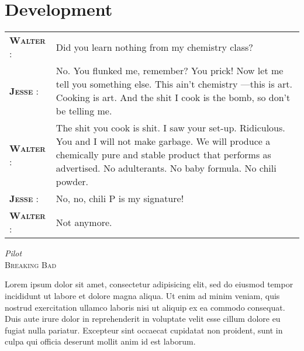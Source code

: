 \chapter{Development} %
\label{cha:development}

\setlength{\epigraphwidth}{10cm}
\renewcommand{\tabcolsep}{0em}

\epigraph{
  \begin{tabular}{p{1.75cm}p{8cm}}
    \footnotesize{\textbf{\textsc{Walter}} :}
      & Did you learn nothing from my chemistry class? \\
    \footnotesize{\textbf{\textsc{Jesse}} :}
      & No. You flunked me, remember? You prick! Now let me tell you something else. This ain't chemistry ---this is art. Cooking is art. And the shit I cook is the bomb, so don't be telling me. \\
    \footnotesize{\textbf{\textsc{Walter}} :}
      & The shit you cook is shit. I saw your set-up. Ridiculous. You and I will not make garbage. We will produce a chemically pure and stable product that performs as advertised. No adulterants. No baby formula. No chili powder. \\
    \footnotesize{\textbf{\textsc{Jesse}} :}
      & No, no, chili P is my signature! \\
    \footnotesize{\textbf{\textsc{Walter}} :}
      & Not anymore. \\
  \end{tabular}
  \vspace{1em}
}{\textit{Pilot}\\ \textsc{Breaking Bad}}

\newpage

Lorem ipsum dolor sit amet, consectetur adipisicing elit, sed do eiusmod tempor incididunt ut labore et dolore magna aliqua. Ut enim ad minim veniam, quis nostrud exercitation ullamco laboris nisi ut aliquip ex ea commodo consequat. Duis aute irure dolor in reprehenderit in voluptate velit esse cillum dolore eu fugiat nulla pariatur. Excepteur sint occaecat cupidatat non proident, sunt in culpa qui officia deserunt mollit anim id est laborum.




